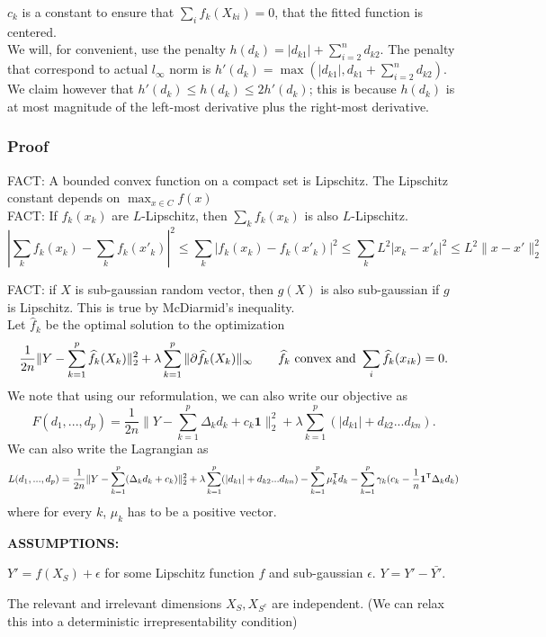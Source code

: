 \documentclass{article}
\begin{document}
$c_k$ is a constant to ensure that $\sum_i f_k(X_{ki}) = 0$, that the fitted function is centered.\\

We will, for convenient, use the penalty $h(d_k) = |d_{k1}| + \sum_{i=2}^n d_{k2}$. The penalty that correspond to actual $l_\infty$ norm is $h'(d_k) = \max( |d_{k1}|, d_{k1} + \sum_{i=2}^n d_{k2})$. We claim however that $h'(d_k) \leq h(d_k) \leq 2h'(d_k)$; this is because $h(d_k)$ is at most magnitude of the left-most derivative plus the right-most derivative.

\subsubsection{Proof}

FACT: A bounded convex function on a compact set is Lipschitz. The Lipschitz constant depends on $\max_{x \in C} f(x)$\\

FACT: If $f_k(x_k)$ are $L$-Lipschitz, then $\sum_k f_k(x_k)$ is also $L$-Lipschitz.
\[
| \sum_k f_k(x_k) - \sum_k f_k(x'_k) |^2 \leq \sum_k |f_k(x_k) - f_k(x'_k)|^2 \leq \sum_k L^2| x_k - x'_k |^2 \leq L^2 \| x - x' \|_2^2
\]

FACT: if $X$ is sub-gaussian random vector, then $g(X)$ is also sub-gaussian if $g$ is Lipschitz. This is true by McDiarmid's inequality.\\


Let $\hat{f}_k$ be the optimal solution to the optimization
\[
\frac{1}{2n} \| Y - \sum_{k=1}^p \widehat{f}_k(X_k) \|_2^2 + \lambda\sum_{k=1}^p \| \partial \widehat{f}_k(X_k)\|_\infty \qquad \widehat{f}_k \textrm{ convex and } \sum_i \widehat{f}_k (x_{ik}) = 0 .
\]
We note that using our reformulation, we can also write our objective as
\[
F(d_1,..., d_p) = \frac{1}{2n} \| Y - \sum_{k=1}^p \Delta_k d_k + c_k \mathbf{1} \|_2^2 + \lambda \sum_{k=1}^p ( |d_{k1}| + d_{k2} ... d_{kn} ) .
\]
We can also write the Lagrangian as 
\[
L(d_1,..., d_p) = \frac{1}{2n} \| Y - \sum_{k=1}^p (\Delta_k d_k + c_k )\|_2^2 + \lambda \sum_{k=1}^p ( |d_{k1}| + d_{k2} ... d_{kn} )  - \sum_{k=1}^p \mu_k^{\mathsf{T}} d_k - \sum_{k=1}^p \gamma_k (c_k - \frac{1}{n} \mathbf{1}^{\mathsf{T}} \Delta_k d_k)
\]
where for every $k$, $\mu_k$ has to be a positive vector.

\textbf{ASSUMPTIONS: }
\begin{packed_enum}
\item $Y' = f(X_S) + \epsilon$ for some Lipschitz function $f$ and sub-gaussian $\epsilon$. $Y = Y' - \bar{Y'}$.
\item The relevant and irrelevant dimensions $X_S, X_{S^c}$ are independent. (We can relax this into a deterministic irrepresentability condition)
\end{packed_enum}
\end{document}
